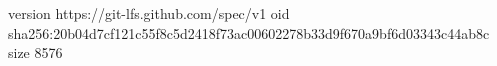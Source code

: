 version https://git-lfs.github.com/spec/v1
oid sha256:20b04d7cf121c55f8c5d2418f73ac00602278b33d9f670a9bf6d03343c44ab8c
size 8576
